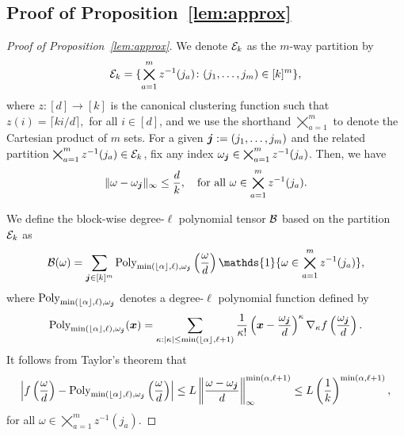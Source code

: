 \documentclass[12pt]{article}
\theoremstyle{definition}
\begin{document}
\subsection{Proof of Proposition~\ref{lem:approx}}
\begin{proof}[Proof of Proposition~\ref{lem:approx}]
We denote $\mathcal{E}_k$ as the $m$-way partition by
\begin{align}
    \mathcal{E}_k = \{\bigtimes_{a=1}^m z^{-1}(j_a)\colon (j_1,\ldots,j_m)\in [k]^m\}, 
\end{align}
where $z\colon [d]\rightarrow[k]$ is the canonical clustering function such that $z(i) = \lceil ki/d\rceil,$ for all $i \in[d]$, and we use the shorthand $\bigtimes_{a=1}^m$ to denote the Cartesian product of $m$ sets. For a given $\bm{j}:=(j_1,\ldots,j_m)$ and the related partition  $ \bigtimes_{a=1}^m z^{-1}(j_a)\in\mathcal{E}_k$, fix any index  $\omega_{\bm{j}} \in \bigtimes_{a=1}^m z^{-1}(j_a)$. Then, we have 
\begin{align}\label{eq:ind}
\|\omega-\omega_{\bm{j}}\|_\infty \leq \frac{d}{k},\quad \text{for all }\omega\in \bigtimes_{a=1}^m z^{-1}(j_a). 
\end{align} 

We define the block-wise degree-$\ell$ polynomial tensor $\mathcal{B}$ based on the partition $\mathcal{E}_k$ as
\begin{align}
    \tB(\omega) = \sum_{\mj\in[k]^m}\text{Poly}_{\min(\lfloor \alpha \rfloor,\ell), \omega_{\mj}}\left({\omega\over d}\right)\mathds{1}\{\omega \in \bigtimes_{a=1}^m z^{-1}(j_a)\},
\end{align}
where $\text{Poly}_{\min(\lfloor \alpha \rfloor,\ell),\omega_{\bm{j}}}$ denotes a degree-$\ell$ polynomial function defined by
\begin{align}
\text{Poly}_{\min(\lfloor \alpha \rfloor,\ell),\omega_{\bm{j}}} (\bm x)=\sum_{\kappa:|\kappa|\leq \min(\lfloor \alpha\rfloor,\ell+1)}{1\over \kappa!}\left(\bm x-{\omega_{\bm{j}}\over d}\right)^\kappa \nabla_\kappa f\left({\omega_{\bm{j}}\over d}\right).
\end{align}
It follows from Taylor's theorem that
\begin{align}\label{eq:polyapp}
\left|f\left({\omega\over d}\right)-\text{Poly}_{\min(\lfloor \alpha \rfloor,\ell),\omega_{\bm{j}}}\left({\omega\over d}\right)\right|\leq L\left\|{\omega-\omega_{\bm{j}}\over d}\right\|_{\infty}^{\min(\alpha,\ell+1)}\leq L \left({1\over k} \right)^{\min(\alpha,\ell+1)},
\end{align}
for all $\omega\in  \bigtimes_{a=1}^m z^{-1}(j_a)$. 


\end{proof}
\end{document}
